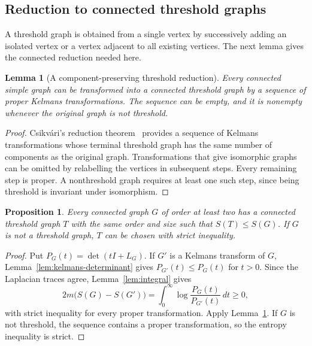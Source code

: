 \documentclass[11pt,a4paper,reqno]{amsart}
\newtheorem{lemma}[theorem]{Lemma}
\newtheorem{proposition}[theorem]{Proposition}
\theoremstyle{remark}
\newcommand{\Ent}{S}
\numberwithin{equation}{section}
\begin{document}
\subsection{Reduction to connected threshold graphs}\label{subsec:connected-threshold-reduction}
A threshold graph is obtained from a single vertex by successively adding
an isolated vertex or a vertex adjacent to all existing vertices. The next
lemma gives the connected reduction needed here.

\begin{lemma}[A component-preserving threshold reduction]
\label{lem:elementary-threshold-reduction}
Every connected simple graph can be transformed into a connected threshold
graph by a sequence of proper Kelmans transformations. The sequence can
be empty, and it is nonempty whenever the original graph is not threshold.
\end{lemma}
\begin{proof}
Csikv\'ari's reduction theorem~\cite[Theorem~2.6(b)]{Csikvari2011}
provides a sequence of Kelmans transformations whose terminal threshold
graph has the same number of components as the original graph.
Transformations that give isomorphic graphs can be omitted by
relabelling the vertices in subsequent steps.
Every remaining step is proper. A nonthreshold graph requires at least
one such step, since being threshold is invariant under isomorphism.
\end{proof}


\begin{proposition}\label{prop:threshold-reduction}
Every connected graph $G$ of order at least two has a connected threshold
graph $T$ with the same order and size such that $\Ent(T)\le\Ent(G)$. If $G$ is not a
threshold graph, $T$ can be chosen with strict inequality.
\end{proposition}
\begin{proof}
Put $P_G(t)=\det(tI+L_G)$. If $G'$ is a Kelmans transform of $G$,
Lemma~\ref{lem:kelmans-determinant} gives $P_{G'}(t)\le P_G(t)$ for $t>0$.
Since the Laplacian traces agree, Lemma~\ref{lem:integral} gives
\begin{equation}\label{eq:kelmans-entropy}
 2m\bigl(\Ent(G)-\Ent(G')\bigr)
 =\int_0^\infty\log\frac{P_G(t)}{P_{G'}(t)}\,dt\ge0,
\end{equation}
with strict inequality for every proper transformation.
Apply Lemma~\ref{lem:elementary-threshold-reduction}.
If $G$ is not threshold, the sequence contains a proper transformation,
so the entropy inequality is strict.
\end{proof}
\end{document}
